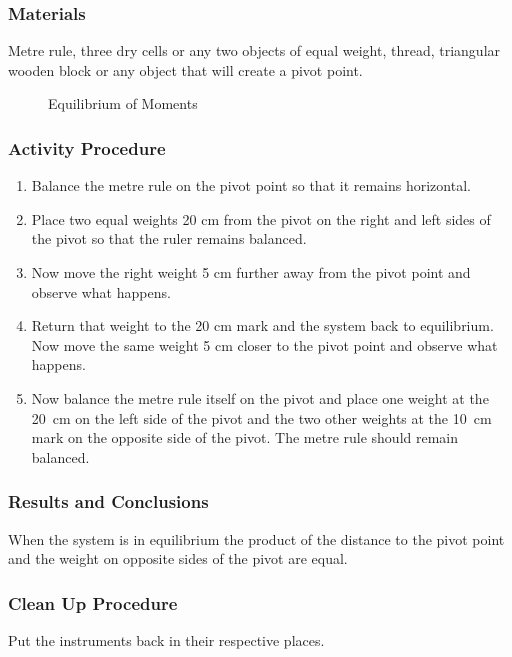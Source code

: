 \subsubsection*{Materials}
Metre rule, three dry cells or any two objects of equal weight, thread, triangular wooden block or any object that will create a pivot point.  

\begin{figure}[h]
\begin{center}
\def\svgwidth{200pt}

\caption{Equilibrium of Moments}
\label{fig:equilibrium-moment}
\end{center}
\end{figure}

\subsubsection*{Activity Procedure}
\begin{enumerate}
\item{Balance the metre rule on the pivot point so that it remains horizontal.} 
\item{Place two equal weights 20 cm from the pivot on the right and left sides of the pivot so that the ruler remains balanced.} 
\item{Now move the right weight 5 cm further away from the pivot point and observe what happens.} 
\item{Return that weight to the 20 cm mark and the system back to equilibrium. Now move the same weight 5 cm closer to the pivot point and observe what happens.} 
\item{Now balance the metre rule itself on the pivot and place one weight at the 20~cm on the left side of the pivot and the two other weights at the 10~cm mark on the opposite side of the pivot. The metre rule should remain balanced.} 
\end{enumerate}

\subsubsection*{Results and Conclusions}
When the system is in equilibrium the product of the distance to the pivot point and the weight on opposite sides of the pivot are equal.  

\subsubsection*{Clean Up Procedure}
Put the instruments back in their respective places.

